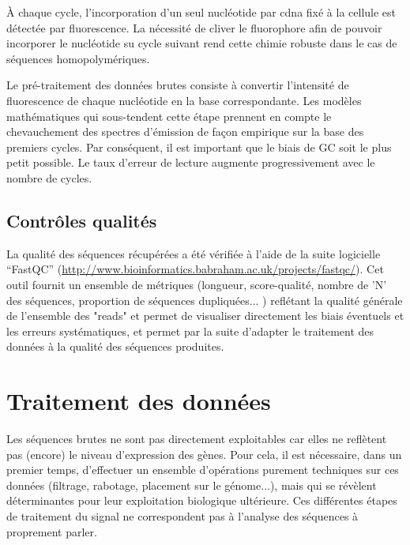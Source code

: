 \documentclass[../main.tex]{subfiles}
\begin{document}
À chaque cycle, l'incorporation d'un seul nucléotide par \gls{cdna} fixé à la cellule est détectée par fluorescence.
La nécessité de cliver le fluorophore afin de pouvoir incorporer le nucléotide su cycle suivant rend cette chimie robuste dans le cas de séquences homopolymériques.
\par
Le pré-traitement des données brutes consiste à convertir l'intensité de fluorescence de chaque nucléotide en la base correspondante.
Les modèles mathématiques qui sous-tendent cette étape prennent en compte le chevauchement des spectres d'émission de façon empirique sur la base des premiers cycles.
Par conséquent, il est important que le biais de GC soit le plus petit possible.
Le taux d'erreur de lecture augmente progressivement avec le nombre de cycles.

\subsection{Contrôles qualités}
La qualité des séquences récupérées a été vérifiée à l'aide de la suite logicielle ``FastQC'' (\url{http://www.bioinformatics.babraham.ac.uk/projects/fastqc/}).
Cet outil fournit un ensemble de métriques (longueur, score-qualité, nombre de 'N' des séquences, proportion de séquences dupliquées... ) reflétant la qualité générale de l'ensemble des "reads" et permet de visualiser directement les biais éventuels et les erreurs systématiques, et permet par la suite d'adapter le traitement des données à la qualité des séquences produites.




\section{Traitement des données}
Les séquences brutes ne sont pas directement exploitables car elles ne reflètent pas (encore) le niveau d'expression des gènes.
Pour cela, il est nécessaire, dans un premier temps, d'effectuer un ensemble d'opérations purement techniques sur ces données (filtrage, rabotage, placement sur le génome...), mais qui se révèlent déterminantes pour leur exploitation biologique ultérieure.
Ces différentes étapes de traitement du signal ne correspondent pas à l'analyse des séquences à proprement parler. 
\end{document}
